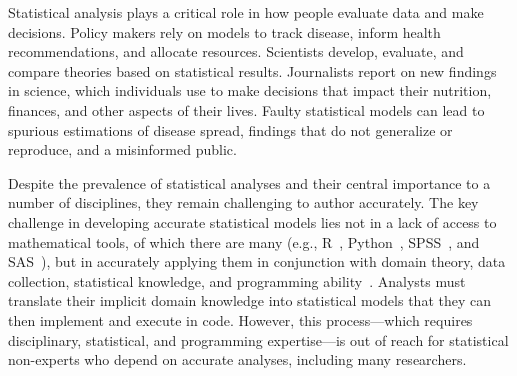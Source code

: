 
Statistical analysis plays a critical role in how people evaluate data and make
decisions. Policy makers rely on models to track disease, inform health
recommendations, and allocate resources. Scientists develop, evaluate, and
compare theories based on statistical results. Journalists report on new
findings in science, which individuals use to make decisions that impact their
nutrition, finances, and other aspects of their lives. Faulty statistical models can lead to spurious estimations of disease spread,
findings that do not generalize or reproduce, and a misinformed public. 

Despite the prevalence of statistical analyses and their central importance to a
number of disciplines, they remain challenging to author accurately. The key
challenge in developing accurate statistical models lies not in a lack of access
to mathematical tools, of which there are many (e.g., R~\cite{team2013r},
Python~\cite{sanner1999python}, SPSS~\cite{spss}, and SAS~\cite{sas}), but in
accurately applying them in conjunction with domain theory, data collection,
statistical knowledge, and programming ability~\cite{mcelreath2020statistical}.
Analysts must translate their implicit domain knowledge into statistical models
that they can then implement and execute in code. However, this process---which
requires disciplinary, statistical, and programming expertise---is out of reach
for statistical non-experts who depend on accurate analyses, including many
researchers. 


